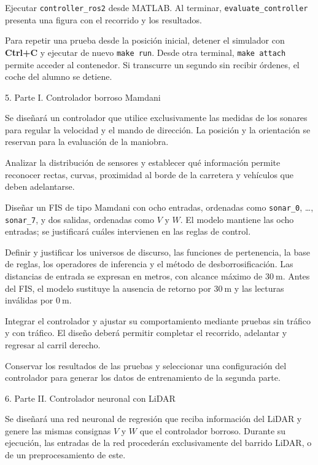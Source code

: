 \documentclass[11pt,a4paper]{article}
\newcommand{\problem}[1]{%
  \par\addvspace{4.2mm}%
  {\rmfamily\fontsize{16}{18}\selectfont\color{headingblue}#1\par}%
  \nobreak\vspace{1.6mm}\nobreak
}
\newcommand{\romanitem}[2]{%
  \par\vspace{2mm}%
  \noindent\hangindent=8mm\hangafter=1%
  \makebox[8mm][r]{\textbf{#1.}\hspace{1.5mm}}#2\par
}
\begin{document}
\romanitem{iv}{Ejecutar \texttt{controller\_ros2} desde MATLAB.
Al terminar, \texttt{evaluate\_controller} presenta una figura con
el recorrido y los resultados.}

Para repetir una prueba desde la posición inicial, detener el simulador
con \textbf{Ctrl+C} y ejecutar de nuevo \texttt{make run}.
Desde otra terminal, \texttt{make attach} permite acceder al contenedor.
Si transcurre un segundo sin recibir órdenes, el coche del alumno se detiene.

\problem{5. Parte I. Controlador borroso Mamdani}

Se diseñará un controlador que utilice exclusivamente las medidas de los
sonares para regular la velocidad y el mando de dirección.
La posición y la orientación se reservan para la evaluación de la maniobra.

\romanitem{i}{Analizar la distribución de sensores y establecer qué
información permite reconocer rectas, curvas, proximidad al borde de la
carretera y vehículos que deben adelantarse.}

\romanitem{ii}{Diseñar un FIS de tipo Mamdani con ocho entradas, ordenadas
como \texttt{sonar\_0}, \ldots, \texttt{sonar\_7}, y dos salidas,
ordenadas como $V$ y $W$. El modelo mantiene las ocho entradas;
se justificará cuáles intervienen en las reglas de control.}

\romanitem{iii}{Definir y justificar los universos de discurso, las
funciones de pertenencia, la base de reglas, los operadores de inferencia
y el método de desborrosificación. Las distancias de entrada se
expresan en metros, con alcance máximo de $30\ \mathrm{m}$.
Antes del FIS, el modelo sustituye la ausencia de retorno por
$30\ \mathrm{m}$ y las lecturas inválidas por $0\ \mathrm{m}$.}

\romanitem{iv}{Integrar el controlador y ajustar su comportamiento mediante
pruebas sin tráfico y con tráfico. El diseño deberá permitir completar
el recorrido, adelantar y regresar al carril derecho.}

\romanitem{v}{Conservar los resultados de las pruebas y seleccionar una
configuración del controlador para generar los datos de entrenamiento
de la segunda parte.}

\newpage
\problem{6. Parte II. Controlador neuronal con LiDAR}

Se diseñará una red neuronal de regresión que reciba información del LiDAR
y genere las mismas consignas $V$ y $W$ que el controlador borroso.
Durante su ejecución, las entradas de la red procederán exclusivamente del
barrido LiDAR, o de un preprocesamiento de este.
\end{document}
